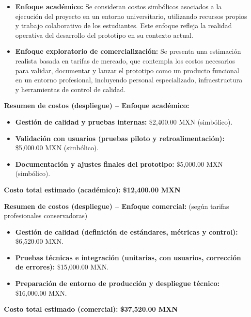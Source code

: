 \begin{itemize}
	\item \textbf{Enfoque académico:} Se consideran costos simbólicos asociados a la ejecución del proyecto en un entorno universitario, utilizando recursos propios y trabajo colaborativo de los estudiantes. Este enfoque refleja la realidad operativa del desarrollo del prototipo en su contexto actual.
	
	\item \textbf{Enfoque exploratorio de comercialización:} Se presenta una estimación realista basada en tarifas de mercado, que contempla los costos necesarios para validar, documentar y lanzar el prototipo como un producto funcional en un entorno profesional, incluyendo personal especializado, infraestructura y herramientas de control de calidad.
\end{itemize}

\vspace{1em}
\noindent\textbf{Resumen de costos (despliegue) – Enfoque académico:}
\begin{itemize}
	\item \textbf{Gestión de calidad y pruebas internas:} \$2,400.00 MXN (simbólico).
	\item \textbf{Validación con usuarios (pruebas piloto y retroalimentación):} \$5,000.00 MXN (simbólico).
	\item \textbf{Documentación y ajustes finales del prototipo:} \$5,000.00 MXN (simbólico).
\end{itemize}

\noindent\textbf{Costo total estimado (académico):} \textbf{\$12,400.00 MXN}

\vspace{1em}
\noindent\textbf{Resumen de costos (despliegue) – Enfoque comercial:} (según tarifas profesionales conservadoras)

\begin{itemize}
	\item \textbf{Gestión de calidad (definición de estándares, métricas y control):} \$6,520.00 MXN.
	\item \textbf{Pruebas técnicas e integración (unitarias, con usuarios, corrección de errores):} \$15,000.00 MXN.
	\item \textbf{Preparación de entorno de producción y despliegue técnico:} \$16,000.00 MXN.
\end{itemize}

\noindent\textbf{Costo total estimado (comercial):} \textbf{\$37,520.00 MXN}


